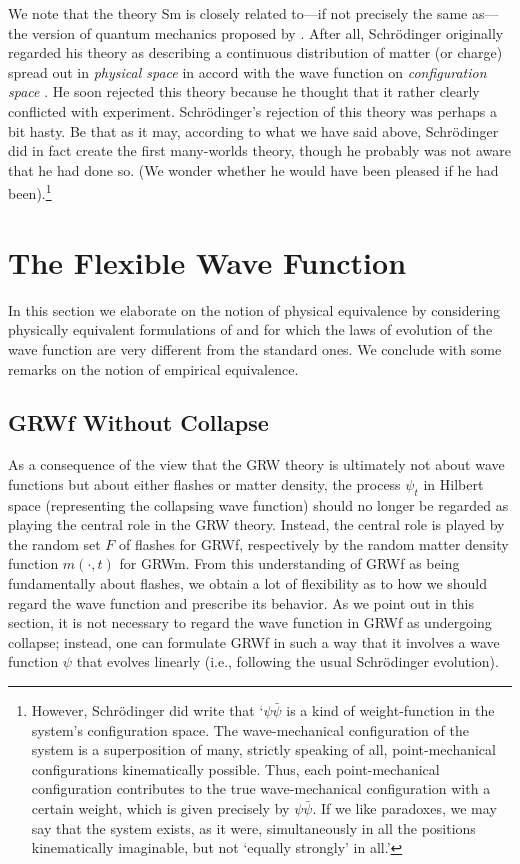 \documentclass[12pt]{article}
\begin{document}
We note that the theory {\sf Sm} is closely related to---if not precisely the same as---the version of quantum mechanics proposed by \citet{sch1}. After all, Schr\"odinger originally regarded his theory as describing a continuous distribution of matter (or charge) spread out in {\em physical space} in accord with the wave function on {\em configuration space} \citep{sch1}. He soon rejected this theory because he thought that it rather clearly conflicted with experiment.  Schr\"odinger's rejection of this theory was perhaps a bit hasty. Be that as it may, according to what we have said above, Schr\"odinger did in fact create the first many-worlds theory, though he probably was not aware that he had done so. (We wonder whether he would have been pleased if he had been).\footnote{However, Schr\"odinger did  write that \citep[p. 120]{sch} `$\psi\bar{\psi}$ is a
kind of weight-function in the system's configuration space. The
wave-mechanical configuration of the system is a superposition of
many, strictly speaking of all, point-mechanical configurations kinematically possible. Thus, each point-mechanical configuration contributes to the true wave-mechanical configuration with a certain
weight, which is given precisely by $\psi\bar{\psi}$. If we like paradoxes, we may
say that the system exists, as it were, simultaneously in all the
positions kinematically imaginable, but not  `equally strongly' in all.'}  


\section{The Flexible Wave Function}
\label{sec:tfwf}
In this section we elaborate on the notion of physical  equivalence by
considering physically equivalent  formulations of {} and {}
for which the laws of evolution of the wave function are very different from
the standard ones. We conclude with some remarks on the notion of empirical
equivalence.

\subsection{GRWf Without Collapse}
\label{sec:lgrwf}
As a consequence of the view that the {\sf GRW} theory is ultimately not about wave functions but about either flashes or matter density, the
process $\psi_t$ in Hilbert space (representing the collapsing wave function) should no longer be regarded as playing the central role in
the {\sf GRW} theory. Instead, the central role is played by the random set $F$ of flashes for {\sf GRWf}, respectively by the random matter density function $m(\cdot,t)$ for {\sf GRWm}. 
From this understanding of {\sf GRWf} as being fundamentally about flashes, we obtain a lot of flexibility as to how we should regard the wave function and prescribe its behavior. As we point out in this section, it is not necessary to regard the wave function in {\sf GRWf} as undergoing collapse; instead, one can formulate {\sf GRWf} in such a way that it involves a wave function $\psi$  that evolves linearly (i.e., following the usual Schr\"odinger evolution).  
\end{document}

